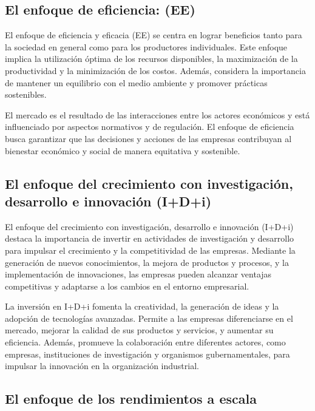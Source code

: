 \documentclass[
  doc,
  floatsintext,
  longtable,
  a4paper,
  nolmodern,
  notxfonts,
  notimes,
  12pt,
  colorlinks=true,linkcolor=blue,citecolor=blue,urlcolor=blue]{apa7}
\begin{document}
\subsection{El enfoque de eficiencia:
(EE)}\label{el-enfoque-de-eficiencia-ee}

El enfoque de eficiencia y eficacia (EE) se centra en lograr beneficios
tanto para la sociedad en general como para los productores
individuales. Este enfoque implica la utilización óptima de los recursos
disponibles, la maximización de la productividad y la minimización de
los costos. Además, considera la importancia de mantener un equilibrio
con el medio ambiente y promover prácticas sostenibles.

El mercado es el resultado de las interacciones entre los actores
económicos y está influenciado por aspectos normativos y de regulación.
El enfoque de eficiencia busca garantizar que las decisiones y acciones
de las empresas contribuyan al bienestar económico y social de manera
equitativa y sostenible.

\subsection{El enfoque del crecimiento con investigación, desarrollo e
innovación
(I+D+i)}\label{el-enfoque-del-crecimiento-con-investigaciuxf3n-desarrollo-e-innovaciuxf3n-idi}

El enfoque del crecimiento con investigación, desarrollo e innovación
(I+D+i) destaca la importancia de invertir en actividades de
investigación y desarrollo para impulsar el crecimiento y la
competitividad de las empresas. Mediante la generación de nuevos
conocimientos, la mejora de productos y procesos, y la implementación de
innovaciones, las empresas pueden alcanzar ventajas competitivas y
adaptarse a los cambios en el entorno empresarial.

La inversión en I+D+i fomenta la creatividad, la generación de ideas y
la adopción de tecnologías avanzadas. Permite a las empresas
diferenciarse en el mercado, mejorar la calidad de sus productos y
servicios, y aumentar su eficiencia. Además, promueve la colaboración
entre diferentes actores, como empresas, instituciones de investigación
y organismos gubernamentales, para impulsar la innovación en la
organización industrial.

\subsection{El enfoque de los rendimientos a
escala}\label{el-enfoque-de-los-rendimientos-a-escala}
\end{document}
